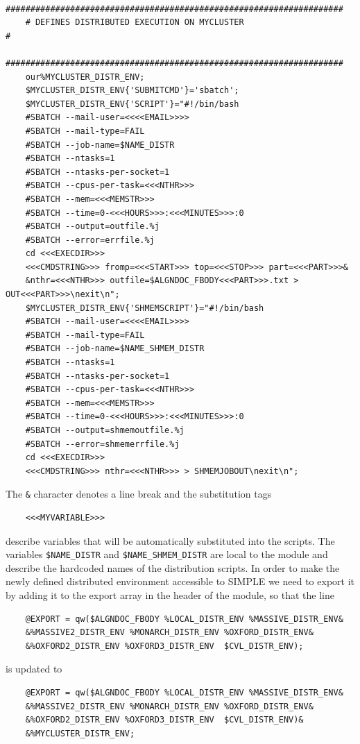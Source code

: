 \documentclass[a4paper,11pt]{article}
\begin{document}
\begin{verbatim}
    ####################################################################
    # DEFINES DISTRIBUTED EXECUTION ON MYCLUSTER                       #
    ####################################################################
    our%MYCLUSTER_DISTR_ENV;
    $MYCLUSTER_DISTR_ENV{'SUBMITCMD'}='sbatch';
    $MYCLUSTER_DISTR_ENV{'SCRIPT'}="#!/bin/bash
    #SBATCH --mail-user=<<<<EMAIL>>>>
    #SBATCH --mail-type=FAIL
    #SBATCH --job-name=$NAME_DISTR
    #SBATCH --ntasks=1
    #SBATCH --ntasks-per-socket=1
    #SBATCH --cpus-per-task=<<<NTHR>>>
    #SBATCH --mem=<<<MEMSTR>>>
    #SBATCH --time=0-<<<HOURS>>>:<<<MINUTES>>>:0
    #SBATCH --output=outfile.%j
    #SBATCH --error=errfile.%j
    cd <<<EXECDIR>>> 
    <<<CMDSTRING>>> fromp=<<<START>>> top=<<<STOP>>> part=<<<PART>>>&
    &nthr=<<<NTHR>>> outfile=$ALGNDOC_FBODY<<<PART>>>.txt > OUT<<<PART>>>\nexit\n";
    $MYCLUSTER_DISTR_ENV{'SHMEMSCRIPT'}="#!/bin/bash
    #SBATCH --mail-user=<<<<EMAIL>>>>
    #SBATCH --mail-type=FAIL
    #SBATCH --job-name=$NAME_SHMEM_DISTR
    #SBATCH --ntasks=1
    #SBATCH --ntasks-per-socket=1
    #SBATCH --cpus-per-task=<<<NTHR>>>
    #SBATCH --mem=<<<MEMSTR>>>
    #SBATCH --time=0-<<<HOURS>>>:<<<MINUTES>>>:0
    #SBATCH --output=shmemoutfile.%j
    #SBATCH --error=shmemerrfile.%j
    cd <<<EXECDIR>>> 
    <<<CMDSTRING>>> nthr=<<<NTHR>>> > SHMEMJOBOUT\nexit\n";
\end{verbatim}
The \texttt{\&} character denotes a line break and the substitution tags
\begin{verbatim}
    <<<MYVARIABLE>>>
\end{verbatim}
describe variables that will be automatically substituted into the scripts. The variables \texttt{\$NAME\_DISTR} and \texttt{\$NAME\_SHMEM\_DISTR} are local to the module and describe the hardcoded names of the distribution scripts. In order to make the newly defined distributed environment accessible to SIMPLE we need to export it by adding it to the export array in the header of the module, so that the line
\begin{verbatim}
    @EXPORT = qw($ALGNDOC_FBODY %LOCAL_DISTR_ENV %MASSIVE_DISTR_ENV&
    &%MASSIVE2_DISTR_ENV %MONARCH_DISTR_ENV %OXFORD_DISTR_ENV&
    &%OXFORD2_DISTR_ENV %OXFORD3_DISTR_ENV  $CVL_DISTR_ENV);
\end{verbatim}
is updated to
\begin{verbatim}
    @EXPORT = qw($ALGNDOC_FBODY %LOCAL_DISTR_ENV %MASSIVE_DISTR_ENV&
    &%MASSIVE2_DISTR_ENV %MONARCH_DISTR_ENV %OXFORD_DISTR_ENV&
    &%OXFORD2_DISTR_ENV %OXFORD3_DISTR_ENV  $CVL_DISTR_ENV)&
    &%MYCLUSTER_DISTR_ENV;
\end{verbatim}
\end{document}
